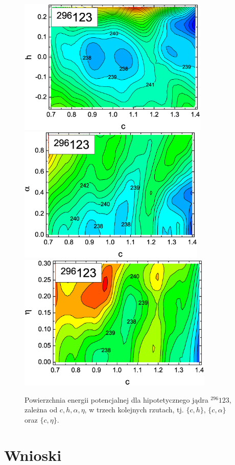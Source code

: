 \documentclass[a4paper,polish]{article}
\numberwithin{equation}{section}
\begin{document}
\begin{figure}[h!]
\centering
\includegraphics[height=6.5cm]{296_123_c_h.eps}
\includegraphics[height=6.5cm]{296_123_c_alpha.eps}
\includegraphics[height=6.5cm]{296_123_c_eta.eps}
\caption{Powierzchnia energii potencjalnej dla hipotetycznego jądra $^{296}123$, zależna od $c,h,\alpha,\eta$, w trzech kolejnych rzutach, tj. $\{c,h\}$, $\{c,\alpha\}$ oraz $\{c,\eta\}$. }
\label{123}
\end{figure}

\clearpage
\section{Wnioski}
\end{document}
